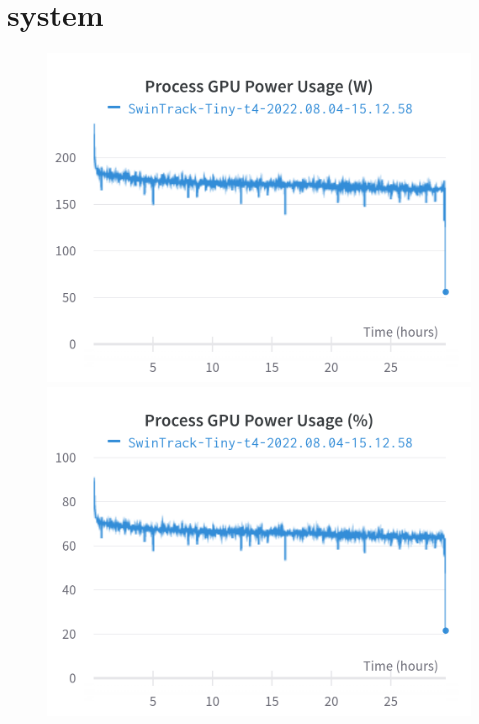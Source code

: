 \documentclass{article}
\begin{document}
\section{system}
\begin{figure}[h]
\includegraphics[width=\linewidth]{charts/Section-4-Panel-0-e7dzzsoh3}
\caption{}
\endminipage\hfill
{}
\includegraphics[width=\linewidth]{charts/Section-4-Panel-1-voj2ql7do}
\caption{}
\endminipage
\end{figure}
\end{document}
